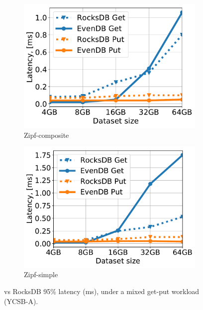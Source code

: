 \begin{figure}[htb]
\centering
\begin{subfigure}{0.49\linewidth}
\includegraphics[width=\textwidth]{figs/tail_flurry_line.pdf}
\caption{Zipf-composite}
\label{fig:tail_latency:co}
\end{subfigure}
\begin{subfigure}{0.49\linewidth}
\includegraphics[width=\textwidth]{figs/tail_zipf_line.pdf}
\caption{Zipf-simple}
\label{fig:tail_latency:si}
\end{subfigure}
\caption{{\sys\/ vs RocksDB 95\% latency (ms), under a mixed get-put workload (YCSB-A).}}
\label{fig:tail_latency}
\end{figure}

